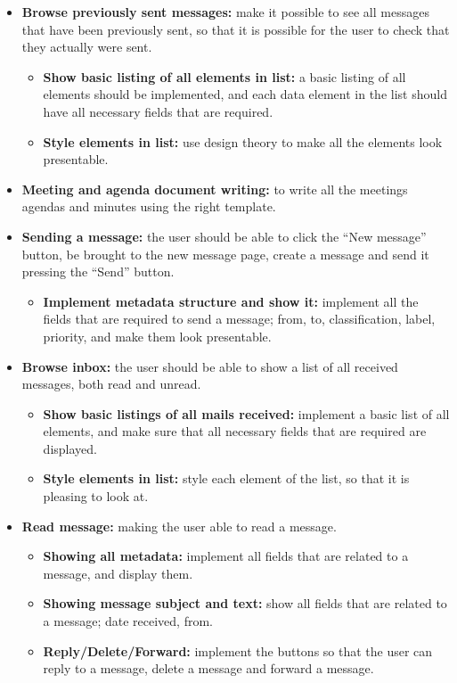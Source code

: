 \begin{itemize}
\item{}\textbf{Browse previously sent messages:} make it possible to see all messages that have been previously sent, so that it is possible for the user to check that they actually were sent.
\begin{itemize}
\item{}\textbf{Show basic listing of all elements in list:} a basic listing of all elements should be implemented, and each data element in the list should have all necessary fields that are required.
\item{}\textbf{Style elements in list:} use design theory to make all the elements look presentable.
\end{itemize}
\item{}\textbf{Meeting and agenda document writing:} to write all the meetings agendas and minutes using the right template.
\item{}\textbf{Sending a message:} the user should be able to click the “New message” button, be brought to the new message page, create a message and send it pressing the “Send” button.
\begin{itemize}
\item{}\textbf{Implement metadata structure and show it:} implement all the fields that are required to send a message; from, to, classification, label, priority, and make them look presentable.
\end{itemize}
\item{}\textbf{Browse inbox:} the user should be able to show a list of all received messages, both read and unread.
\begin{itemize}
\item{}\textbf{Show basic listings of all mails received:} implement a basic list of all elements, and make sure that all necessary fields that are required are displayed.
\item{}\textbf{Style elements in list:} style each element of the list, so that it is pleasing to look at.
\end{itemize}
\item{}\textbf{Read message:} making the user able to read a message.
\begin{itemize}
\item{}\textbf{Showing all metadata:} implement all fields that are related to a message, and display them.
\item{}\textbf{Showing message subject and text:} show all fields that are related to a message; date received, from.
\item{}\textbf{Reply/Delete/Forward:} implement the buttons so that the user can reply to a message, delete a message and forward a message.

\end{itemize}
\end{itemize}
